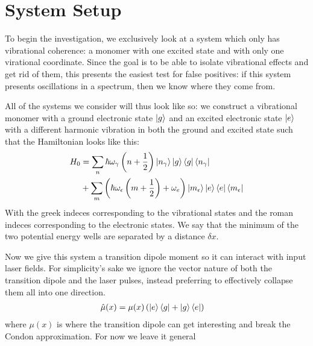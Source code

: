 \section{System Setup}
To begin the investigation, we exclusively look at a system which only has vibrational coherence: a monomer with one excited state and with only one virational coordinate.   Since the goal is to be able to isolate vibrational effects and get rid of them, this presents the easiest test for false positives: if this system presents oscillations in a spectrum, then we know where they come from.

All of the systems we consider will thus look like so: we construct a vibrational monomer with a ground electronic state $\ket{g}$ and an excited electronic state $\ket{e}$ with a different harmonic vibration in both the ground and excited state such that the Hamiltonian looks like this:
\begin{align}
	H_0 &=  \sum_n \hbar \omega_{\gamma}  \left(n + \frac{1}{2} \right)  \ket{n_{\gamma}}\ket{g}\bra{g} \bra{n_{\gamma}} \\
   &+ \sum_m \left(  \hbar \omega_{\epsilon}  \left(m + \frac{1}{2} \right) + \omega_e \right)  \ket{m_{\epsilon}} \ket{e}\bra{e} \bra{m_{\epsilon}}
\end{align}
With the greek indeces corresponding to the vibrational states and the roman indeces corresponding to the electronic states.  We say that the minimum of the two potential energy wells are separated by a distance $\delta x$.

Now we give this system a transition dipole moment so it can interact with input laser fields.  For simplicity's sake we ignore the vector nature of both the transition dipole and the laser pulses, instead preferring to effectively collapse them all into one direction.
\begin{align}
	\hat{\mu}(x) &= \mu (x)  \left( \ket{e}\bra{g} + \ket{g} \bra{e} \right)
\end{align}
where $\mu (x)$ is where the transition dipole can get interesting and break the Condon approximation.  For now we leave it general


